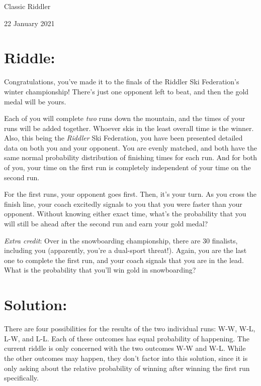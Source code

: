 \documentclass{article}
\begin{document}
\pagestyle{empty} %

\begin{center}
{\LARGE Classic Riddler}

\vspace{0.15in}

{\Large 22 January 2021}
\end{center}


\section*{Riddle:}

Congratulations, you've made it to the finals of the Riddler Ski Federation's winter championship!
There's just one opponent left to beat, and then the gold medal will be yours.

Each of you will complete \textit{two} runs down the mountain, and the times of your runs will be added together.
Whoever skis in the least overall time is the winner.
Also, this being the \textit{Riddler} Ski Federation, you have been presented detailed data on both you and your opponent.
You are evenly matched, and both have the same normal probability distribution of finishing times for each run.
And for both of you, your time on the first run is completely independent of your time on the second run.

For the first runs, your opponent goes first.
Then, it's your turn.
As you cross the finish line, your coach excitedly signals to you that you were faster than your opponent.
Without knowing either exact time, what's the probability that you will still be ahead after the second run and earn your gold medal?

\textit{Extra credit}: Over in the snowboarding championship, there are 30 finalists, including you (apparently, you're a dual-sport threat!).
Again, you are the last one to complete the first run, and your coach signals that you are in the lead.
What is the probability that you'll win gold in snowboarding?


\section*{Solution:}

There are four possibilities for the results of the two individual runs: W-W, W-L, L-W, and L-L.
Each of these outcomes has equal probability of happening.
The current riddle is only concerned with the two outcomes W-W and W-L.
While the other outcomes may happen, they don't factor into this solution, since it is only asking about the relative probability of winning after winning the first run specifically.
\end{document}
